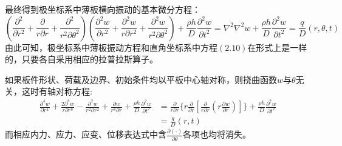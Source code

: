 \documentclass[withoutpreface,bwprint]{cumcmthesis} %
\begin{document}
	最终得到极坐标系中薄板横向振动的基本微分方程：
	\begin{equation}
		(\frac{\partial^2}{\partial r^2}+\frac{\partial }{r\partial r}+\frac{\partial^2}{r^2\partial \theta^2})(\frac{\partial^2 w}{\partial r^2}+\frac{\partial^2 w}{r\partial r^2}+\frac{\partial^2w}{r^2\partial\theta^2})+\frac{\rho h}{D}\frac{\partial^2w}{\partial t^2}=\nabla^2\nabla^2w+\frac{\rho h}{D}\frac{\partial^2w}{\partial t^2}=\frac{q}{D}(r,\theta,t)
	\end{equation}
	由此可知，极坐标系中薄板振动方程和直角坐标系中方程$(2.10)$在形式上是一样的，只要各自采用相应的拉普拉斯算子。
	
	如果板件形状、荷载及边界、初始条件均以平板中心轴对称，则挠曲函数$w$与$\theta$无关，这时有轴对称方程:
	\begin{equation}
		\begin{aligned} 
		\frac{\partial^4 w}{\partial r^4}+\frac{2\partial^8 w}{r\partial r^8}-\frac{\partial^2 w}{r^2\partial r^2}+\frac{\partial w}{r^8\partial r}+\frac{\rho h}{D}\frac{\partial^2 w}{\partial t^2}&=\frac{\partial}{r\partial r}\{r\frac{\partial}{\partial r}[\frac{\partial}{r\partial r}(r\frac{\partial w}{\partial r})]\}+\frac{\rho h}{D}\frac{\partial^2 w}{\partial t^2}\\
		&=\frac{q}{D}(r,t)
		\end{aligned} 
	\end{equation}
	而相应内力、应力、应变、位移表达式中含$\tfrac{\partial (\cdot)}{\partial\theta}$各项也均将消失。
\end{document}
